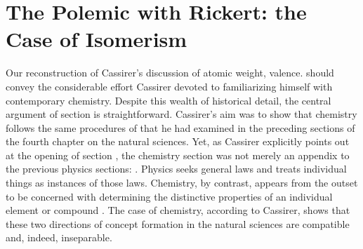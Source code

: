 \documentclass[submitted,12pt]{article}
\begin{document}
\section{The Polemic with Rickert: the Case of Isomerism}
\label{sec:rickert}



Our reconstruction of Cassirer's discussion of atomic weight, valence\etc. should convey the considerable effort Cassirer devoted to familiarizing himself with contemporary chemistry. Despite this wealth of historical detail, the central argument of section  is straightforward. Cassirer's aim was to show that chemistry follows the same procedures of   that he had examined in the preceding sections of the fourth chapter on the natural sciences. Yet, as Cassirer explicitly points out at the opening of section , the chemistry section was not merely an appendix to the previous physics sections:  . Physics seeks general laws and treats individual things as instances of those laws. Chemistry, by contrast, appears from the outset to be concerned with determining the distinctive properties of an individual element or compound  . The case of chemistry, according to Cassirer, shows that these two directions of concept formation in the natural sciences are compatible and, indeed, inseparable. 


\end{document}
